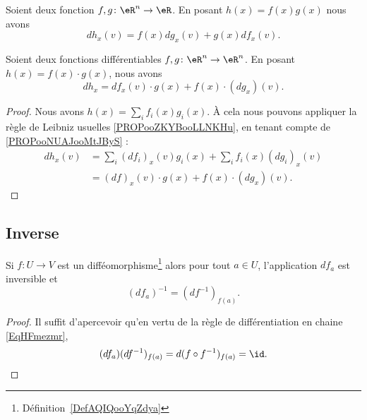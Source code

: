 \begin{proposition}	\label{PROPooZKYBooLLNKHu}
	Soient deux fonction \(f,g \colon \eR^n\to \eR  \). En posant \( h(x)=f(x)g(x)\) nous avons
	\begin{equation}
		dh_x(v)=f(x)dg_x(v)+g(x)df_x(v).
	\end{equation}
\end{proposition}


\begin{proposition}	\label{PROPooOIMLooUhkkmy}
	Soient deux fonctions différentiables \(f,g \colon \eR^n\to \eR^n  \). En posant \( h(x)=f(x)\cdot g(x)\), nous avons
	\begin{equation}
		dh_x=df_x(v)\cdot g(x)+f(x)\cdot (dg_x)(v).
	\end{equation}
\end{proposition}

\begin{proof}
	Nous avons \( h(x)=\sum_if_i(x)g_i(x)\). À cela nous pouvons appliquer la règle de Leibniz usuelles \ref{PROPooZKYBooLLNKHu}, en tenant compte de \ref{PROPooNUAJooMtJByS} :
	\begin{subequations}
		\begin{align}
			dh_x(v) & =\sum_i(df_i)_x(v)g_i(x)+\sum_if_i(x)(dg_i)_x(v) \\
			        & = (df)_x(v)\cdot g(x)+f(x)\cdot (dg_x)(v).
		\end{align}
	\end{subequations}
\end{proof}

\subsection{Inverse}


\begin{lemma}       \label{LemooTJSZooWkuSzv}
	Si \( f\colon U\to V\) est un difféomorphisme\footnote{Définition~\ref{DefAQIQooYqZdya}} alors pour tout \( a\in U\), l'application \( df_a\) est inversible et
	\begin{equation}
		(df_a)^{-1}=(df^{-1})_{f(a)}.
	\end{equation}
\end{lemma}

\begin{proof}
	Il suffit d'apercevoir qu'en vertu de la règle de différentiation en chaine \eqref{EqHFmezmr},
	\begin{equation}
		(df_a)(df^{-1})_{f(a)}=d(f\circ f^{-1})_{f(a)}=\id.
	\end{equation}
\end{proof}

